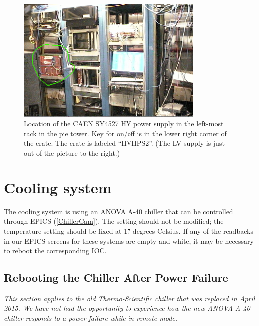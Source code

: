 \documentclass[12pt]{article}
\begin{document}
\begin{figure}[htbp]\centering
    \includegraphics[width=9cm]{pics/ECALHVPHOTO.png}
    \caption{Location of the CAEN SY4527 HV power supply in the left-most rack in the pie tower.  Key for on/off is in the lower right corner of the crate.  The crate is labeled ``HVHPS2''. (The LV supply is just out of the picture to the right.)\label{fig:HVPHOTO}}
\end{figure}

\newpage
   \section{Cooling system}

   The cooling system is using an ANOVA A-40 chiller that can be controlled through EPICS (\ref{ChillerCam}). The setting should not be modified; the temperature setting should be fixed at 17 degrees Celsius.  If any of the readbacks in our EPICS screens for these systems are empty and white, it may be necessary to reboot the corresponding IOC. 
     \subsection{Rebooting the Chiller After Power Failure}
     {\em This section applies to the old Thermo-Scientific chiller that was replaced in April 2015.  We have not had the opportunity to experience how the new ANOVA A-40 chiller responds to a power failure while in remote mode.}
\end{document}

